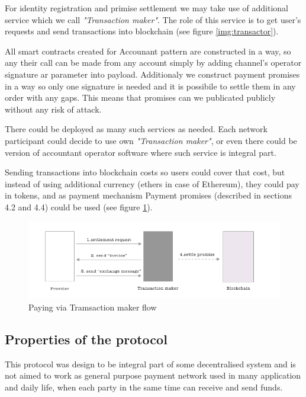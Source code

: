 \documentclass[a4paper,12pt]{article}
\begin{document}
For identity registration and primise settlement we may take use of additional
service which we call \textit{"Transaction maker"}. The role of this service is 
to get user's requests and send transactions into blockchain (see figure 
\ref{img:transactor}).

All smart contracts created for Accounant pattern are constructed in a way, so
any their call can be made from any account simply by adding channel's operator
signature ar parameter into payload. Additionaly we construct payment promises 
in a way so only one signature is needed and it is possibile to settle them in 
any order with any gaps. This means that promises can we publicated publicly
without any risk of attack.

There could be deployed as many such services as needed.
Each network participant could decide to use own \textit{"Transaction maker"},
or even there could be version of accountant operator software where such 
service is integral part.

Sending transactions into blockchain costs so users could cover that cost, but
instead of using additional currency (ethers in case of Ethereum), they could
pay in tokens, and as payment mechanism Payment promises (described in sections
4.2 and 4.4) could be used (see figure \ref{img:transactor-payment}).

\begin{figure}[H]
    \centering
    \includegraphics[scale=0.5]{../img/transactor-payment}
    \caption{Paying via Tramsaction maker flow}
    \label{img:transactor-payment}
\end{figure}

\subsection{Properties of the protocol}

This protocol was design to be integral part of some decentralised system and 
is not aimed to work as general purpose payment network used in many 
application and daily life, when each party in the same time can receive and 
send funds. 
\end{document}
